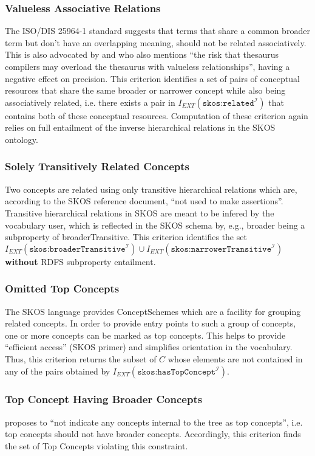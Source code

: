 \subsubsection{Valueless Associative Relations}
The ISO/DIS 25964-1 standard suggests that terms that share a common broader term but don’t have an overlapping meaning, should not be related associatively. This is also advocated by \cite{Hedden2010} and \cite{Aitchison2000} who also mentions ``the risk that thesaurus compilers may overload the thesaurus with valueless relationships'', having a negative effect on precision. This criterion identifies a set of pairs of conceptual resources that share the same broader or narrower concept while also being associatively related, i.e. there exists a pair in $I_{EXT}(\texttt{skos:related}^\mathcal{I})$ that contains both of these conceptual resources. Computation of these criterion again relies on full entailment of the inverse hierarchical relations in the SKOS ontology.

\subsubsection{Solely Transitively Related Concepts}
Two concepts are related using only transitive hierarchical relations which are, according to the SKOS reference document, ``not used to make assertions''. Transitive hierarchical relations in SKOS are meant to be infered by the vocabulary user, which is reflected in the SKOS schema by, e.g., broader being a subproperty of broaderTransitive. This criterion identifies the set $I_{EXT}(\texttt{skos:broaderTransitive}^\mathcal{I}) \cup I_{EXT}(\texttt{skos:narrowerTransitive}^\mathcal{I})$ \textbf{without} RDFS subproperty entailment.

\subsubsection{Omitted Top Concepts}
The SKOS language provides ConceptSchemes which are a facility for grouping related concepts. In order to provide entry points to such a group of concepts, one or more concepts can be marked as top concepts. This helps to provide ``efficient access'' (SKOS primer) and simplifies orientation in the vocabulary. Thus, this criterion returns the subset of $C$ whose elements are not contained in any of the pairs obtained by $I_{EXT}(\texttt{skos:hasTopConcept}^\mathcal{I})$.

\subsubsection{Top Concept Having Broader Concepts}
\cite{Allemang2011} proposes to ``not indicate any concepts internal to the tree as top concepts'', i.e. top concepts should not have broader concepts. Accordingly, this criterion finds the set of Top Concepts violating this constraint.

